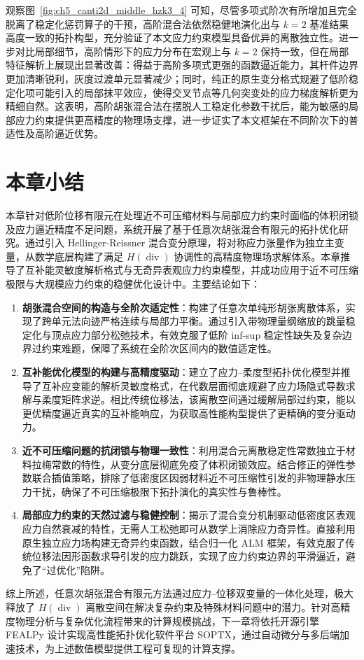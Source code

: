 观察图~\ref{fig:ch5_canti2d_middle_hzk3_4} 可知，尽管多项式阶次有所增加且完全脱离了稳定化惩罚算子的干预，高阶混合法依然稳健地演化出与 $k=2$ 基准结果高度一致的拓扑构型，充分验证了本文应力约束模型具备优异的离散独立性。进一步对比局部细节，高阶情形下的应力分布在宏观上与 $k=2$ 保持一致，但在局部特征解析上展现出显著改善：得益于高阶多项式更强的函数逼近能力，其杆件边界更加清晰锐利，灰度过渡单元显著减少；同时，纯正的原生变分格式规避了低阶稳定化项可能引入的局部抹平效应，使得交叉节点等几何突变处的应力梯度解析更为精细自然。这表明，高阶胡张混合法在摆脱人工稳定化参数干扰后，能为敏感的局部应力约束提供更高精度的物理场支撑，进一步证实了本文框架在不同阶次下的普适性及高阶逼近优势。


\section{本章小结}
\label{sec:hz_summary}

本章针对低阶位移有限元在处理近不可压缩材料与局部应力约束时面临的体积闭锁及应力逼近精度不足问题，系统开展了基于任意次胡张混合有限元的拓扑优化研究。通过引入 Hellinger-Reissner 混合变分原理，将对称应力张量作为独立主变量，从数学底层构建了满足 $H(\operatorname{div})$ 协调性的高精度物理场求解体系。本章推导了互补能灵敏度解析格式与无奇异表观应力约束模型，并成功应用于近不可压缩极限与大规模应力约束的稳健优化设计中。主要结论如下：
\begin{enumerate}[
	label={（\arabic*）},
	labelsep=0.25em,
	leftmargin=3.2em,
	itemsep=0.4em,
	topsep=0.4em,
	parsep=0pt,
	partopsep=0pt
	]
	\item \textbf{胡张混合空间的构造与全阶次适定性}：构建了任意次单纯形胡张离散体系，实现了跨单元法向迹严格连续与局部力平衡。通过引入带物理量纲缩放的跳量稳定化与顶点应力部分松弛技术，有效克服了低阶 inf-sup 稳定性缺失及复杂边界过约束难题，保障了系统在全阶次区间内的数值适定性。
	
	\item \textbf{互补能优化模型的构建与高精度驱动}：建立了应力{--}柔度型拓扑优化模型并推导了互补应变能的解析灵敏度格式，在代数层面彻底规避了应力场隐式导数求解与柔度矩阵求逆。相比传统位移法，该离散空间通过缓解局部过约束，能以更优精度逼近真实的互补能响应，为获取高性能构型提供了更精确的变分驱动力。
	
	\item \textbf{近不可压缩问题的抗闭锁与物理一致性}：利用混合元离散稳定性常数独立于材料拉梅常数的特性，从变分底层彻底免疫了体积闭锁效应。结合修正的弹性参数联合插值策略，排除了低密度区因弱材料近不可压缩性引发的非物理静水压力干扰，确保了不可压缩极限下拓扑演化的真实性与鲁棒性。
	
	\item \textbf{局部应力约束的天然过滤与稳健控制}：揭示了混合变分机制驱动低密度区表观应力自然衰减的特性，无需人工松弛即可从数学上消除应力奇异性。直接利用原生独立应力场构建无奇异约束函数，结合归一化 ALM 框架，有效克服了传统位移法因形函数求导引发的应力跳跃，实现了应力约束边界的平滑逼近，避免了“过优化”陷阱。
\end{enumerate}

综上所述，任意次胡张混合有限元方法通过应力{--}位移双变量的一体化处理，极大释放了 $H(\operatorname{div})$ 离散空间在解决复杂约束及特殊材料问题中的潜力。针对高精度物理分析与复杂优化流程带来的计算规模挑战，下一章将依托开源引擎 FEALPy 设计实现高性能拓扑优化软件平台 SOPTX，通过自动微分与多后端加速技术，为上述数值模型提供工程可复现的计算支撑。


